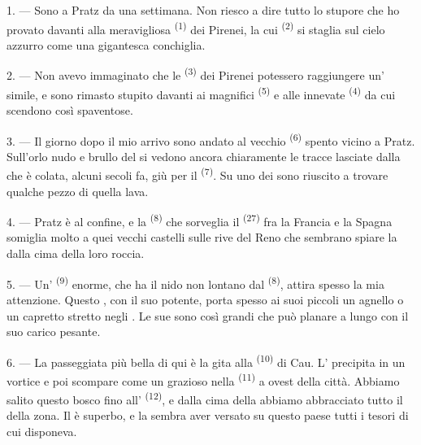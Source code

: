 \VUsaut{3.0mm}

\VUsaut{3.0mm}

1. --- Sono a Pratz da una settimana. Non riesco a dire tutto lo stupore che ho provato
davanti alla meravigliosa  \textsuperscript{(1)} dei Pirenei, la cui
 \textsuperscript{(2)} si staglia sul cielo azzurro come una gigantesca
conchiglia.

2. --- Non avevo immaginato che le  \textsuperscript{(3)} dei Pirenei
potessero raggiungere un' simile, e sono rimasto stupito davanti ai
magnifici  \textsuperscript{(5)} e alle  innevate
\textsuperscript{(4)} da cui scendono  così spaventose.

\VUsaut{3.0mm}
\VUsaut{3.0mm}

3. --- Il giorno dopo il mio arrivo sono andato al vecchio 
\textsuperscript{(6)} spento vicino a Pratz. Sull'orlo nudo e brullo del
 si vedono ancora chiaramente le tracce lasciate dalla 
che è colata, alcuni secoli fa, giù per il 
\textsuperscript{(7)}. Su uno dei  sono riuscito a trovare qualche
pezzo di quella lava.

4. --- Pratz è al confine, e la  \textsuperscript{(8)} che sorveglia
il  \textsuperscript{(27)} fra la Francia e la Spagna somiglia molto a
quei vecchi castelli sulle rive del Reno che sembrano spiare la  dalla
cima della loro roccia.

5. --- Un' \textsuperscript{(9)} enorme, che ha il nido non lontano dal
 \textsuperscript{(8)}, attira spesso la mia attenzione. Questo
, con il suo  potente, porta spesso ai suoi piccoli un
agnello o un capretto stretto negli . Le sue  sono così
grandi che può planare a lungo con il suo carico pesante.

\VUsaut{3.0mm}
\VUsaut{3.0mm}

6. --- La passeggiata più bella di qui è la gita alla 
\textsuperscript{(10)} di Cau. L' precipita in un vortice e poi
scompare come un grazioso  nella 
\textsuperscript{(11)} a ovest della città. Abbiamo salito questo bosco fino
all' \textsuperscript{(12)}, e dalla cima della
 abbiamo abbracciato tutto il  della zona. Il
 è superbo, e la  sembra aver versato su questo paese
tutti i tesori di cui disponeva.

